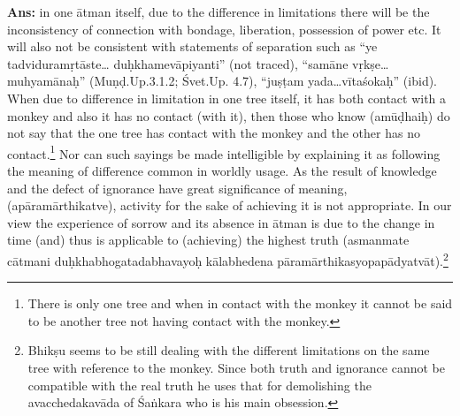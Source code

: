 \textbf{Ans:} in one ātman itself, due to the difference in limitations there will be the inconsistency of connection with bondage, liberation, possession of power etc. It will also not be consistent with statements of separation such as “ye tadviduramṛtāste…   duḥkhamevāpiyanti” (not traced), “samāne vṛkṣe…muhyamānaḥ” (Muṇḍ.Up.3.1.2; Śvet.Up. 4.7), “juṣṭam yada…vītaśokaḥ” (ibid). When due to difference in limitation in one tree itself, it has both contact with a monkey and also it has no contact (with it), then those who know (amūḍhaiḥ) do not say that the one tree has contact with the monkey and the other has no contact.\footnote{There is only one tree and when in contact with the monkey it cannot be said to be another tree not having contact with the monkey.} Nor can such sayings be made intelligible by explaining it as following the meaning of difference common in worldly usage. As the result of knowledge and the defect of ignorance have great significance of meaning, (apāramārthikatve), activity for the sake of achieving it is not appropriate. In our view the experience of sorrow and its absence in ātman is due to the change in time (and) thus is applicable to (achieving) the highest truth (asmanmate cātmani duḥkhabhogatadabhavayoḥ kālabhedena pāramārthikasyopapādyatvāt).\footnote{Bhikṣu seems to be still dealing with the different limitations on the same tree with reference to the monkey. Since both truth and ignorance cannot be compatible with the real truth he uses that for demolishing the avacchedakavāda of Śaṅkara who is his main obsession.} 




